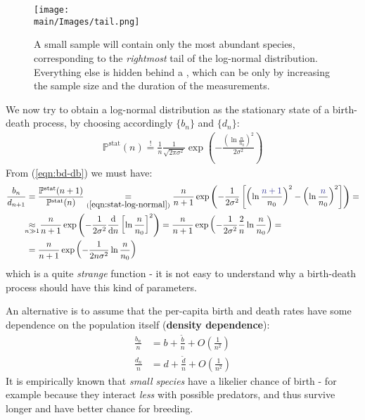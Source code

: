 \documentclass[../../main.tex]{subfiles}
\begin{document}
\begin{figure}[H]
    \centering
    \texttt{[image: \\main/Images/tail.png]}
    \caption{A small sample will contain only the most abundant species, corresponding to the \textit{rightmost} tail of the log-normal distribution. Everything else is hidden behind a , which can be  only by increasing the sample size and the duration of the measurements.}
    \label{fig:tail}
\end{figure}

We now try to obtain a log-normal distribution as the stationary state of a birth-death process, by choosing accordingly $\{b_n\}$ and $\{d_n\}$:
\begin{align}\label{eqn:stat-log-normal}
    \mathbb{P}^{\mathrm{stat}}(n) \overset{!}{=} \frac{1}{n} \frac{1}{\sqrt{2 \pi \sigma^2}} \exp\left(-\frac{\left(\ln \frac{n}{n_0} \right)^2}{2 \sigma^2} \right) 
\end{align}
From (\ref{eqn:bd-db}) we must have:
\begin{align*}
    \frac{b_n}{d_{n+1}} &= \frac{\mathbb{P}^{\mathrm{stat}}(n+1)}{\mathbb{P}^{\mathrm{stat}}(n)} \underset{(\ref{eqn:stat-log-normal})}{=}  \frac{n}{n+1} \exp\left(-\frac{1}{2 \sigma^2} \left[\left(\ln \frac{\textcolor{Blue}{n+1}}{n_0} \right)^2 - \left(\ln \frac{\textcolor{Blue}{n}}{n_0} \right)^2\right]\right) =\\
    &\underset{\mathclap{n \gg 1}}{\approx}\>  \frac{n}{n+1} \exp\left(-\frac{1}{2 \sigma^2} \dv{n} \left[\ln \frac{n}{n_0} \right]^2 \right) = \frac{n}{n+1}\exp\left(-\frac{1}{2 \sigma^2} \frac{2}{n}\ln \frac{n}{n_0}   \right) =\\
    &= \frac{n}{n+1} \exp\left(-\frac{1}{2 n \sigma^2} \ln \frac{n}{n_0}  \right) 
\end{align*}
which is a quite \textit{strange} function - it is not easy to understand why a birth-death process should have this kind of parameters.

\medskip

An alternative is to assume that the per-capita birth and death rates have some dependence on the population itself (\textbf{density dependence}):
\begin{align}\label{eqn:density-dependence}
    \frac{b_n}{n} &= b + \frac{\tilde{b}}{n} + O\left(\frac{1}{n^2} \right)  \\ \nonumber
    \frac{d_n}{n} &= d + \frac{\tilde{d}}{n} + O\left(\frac{1}{n^2} \right)  
\end{align}
It is empirically known that \textit{small species} have a likelier chance of birth - for example because they interact \textit{less} with possible predators, and thus survive longer and have better chance for breeding.
\end{document}
